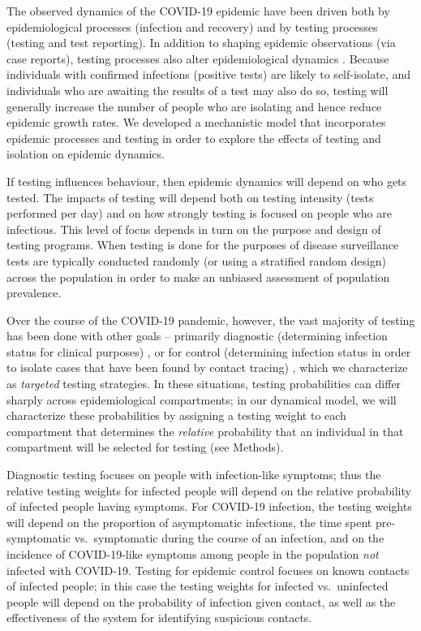 \documentclass[smallextended]{svjour3}       %
\newcommand{\covid}{COVID-19\xspace}
\DeclareRobustCommand\_{\ifmmode\expandafter\subtxt\else\textunderscore\fi}
\begin{document}
The observed dynamics of the \covid epidemic have been driven both by epidemiological processes (infection and recovery) and by testing processes (testing and test reporting). In addition to shaping epidemic observations (via case reports), testing processes also alter epidemiological dynamics \citep{peto2020covid,taipale2020population}. Because individuals with confirmed infections (positive tests) are likely to self-isolate, and individuals who are awaiting the results of a test may also do so, testing will generally increase the number of people who are isolating and hence reduce epidemic growth rates. We developed a mechanistic model that incorporates epidemic processes and testing in order to explore the effects of testing and isolation on epidemic dynamics.

If testing influences behaviour, then epidemic dynamics will depend on who gets tested.
The impacts of testing will depend both on testing intensity (tests performed per day) and on how strongly testing is focused on people who are infectious.
This level of focus depends in turn on the purpose and design of testing programs. 
When testing is done for the purposes of disease surveillance \citep{foddai2020base}
tests are typically conducted randomly (or using a stratified random design) across the population in order to make an unbiased assessment of population prevalence.

Over the course of the \covid pandemic, however, the vast majority of testing has been done with other goals --
primarily diagnostic (determining infection status for clinical purposes) \citep{phua2020intensive,who2020global}, or for control (determining  infection status in order to isolate cases that have been found by contact tracing) \citep{aleta2020modelling,kucharski2020effectiveness,grassly2020comparison,smith2021adherence}, which we characterize as \emph{targeted} testing strategies.
In these situations, testing probabilities can differ sharply across epidemiological compartments; in our dynamical model, we will characterize these probabilities by assigning a testing weight to each compartment that determines the \emph{relative} probability that an individual in that compartment will be selected for testing (see Methods). 

Diagnostic testing focuses on people with infection-like symptoms; thus the relative testing weights for infected people will depend on the relative probability of infected people having symptoms. For \covid infection, the testing weights will depend on the proportion of asymptomatic infections, the time spent pre-symptomatic vs.\ symptomatic during the course of an infection, and on the incidence of \covid-like symptoms among people in the population \emph{not} infected with \covid. Testing for epidemic control focuses on known contacts of infected people; in this case the testing weights for infected vs.\ uninfected people will depend on the probability of infection given contact, as well as the effectiveness of the system for identifying suspicious contacts.
\end{document}
